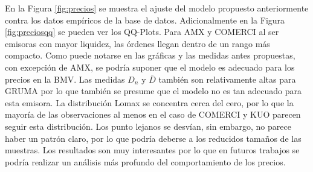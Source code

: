 \documentclass[11pt]{article}
\numberwithin{equation}{section} %
\begin{document}
En la Figura \ref{fig:precios} se muestra el ajuste del modelo propuesto anteriormente contra los datos empíricos de la base de datos. Adicionalmente en la Figura \ref{fig:preciosqq} se pueden ver los QQ-Plots. Para AMX y COMERCI al ser emisoras con mayor liquidez, las órdenes llegan dentro de un rango más compacto. Como puede notarse en las gráficas y las medidas antes propuestas, con excepción de AMX, se podría suponer que el modelo es adecuado para los precios en la BMV. Las medidas $D_n$ y $\bar{D}$ también son relativamente altas para GRUMA por lo que también se presume que el modelo no es tan adecuado para esta emisora. La distribución Lomax se concentra cerca del cero, por lo que la mayoría de las observaciones al menos en el caso de COMERCI y KUO parecen seguir esta distribución. Los punto lejanos se desvían, sin embargo, no parece haber un patrón claro, por lo que podría deberse a los reducidos tamaños de las muestras. Los resultados son muy interesantes por lo que en futuros trabajos se podría realizar un análisis más profundo del comportamiento de los precios.
\end{document}
